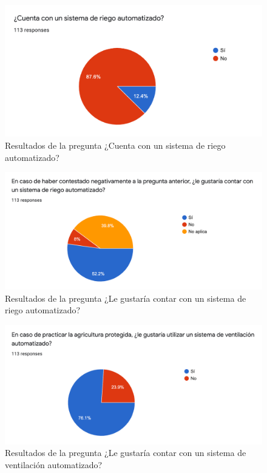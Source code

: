 \begin{figure}[!h]
	\centering
	\includegraphics[width=1\linewidth]{imagenes/encuesta/pregunta_3.png}
	\caption{Resultados de la pregunta ¿Cuenta con un sistema de riego automatizado?}
	\label{fig:pregunta_3}
\end{figure}

\begin{figure}[!h]
	\centering
	\includegraphics[width=1\linewidth]{imagenes/encuesta/pregunta_4.png}
	\caption{Resultados de la pregunta ¿Le gustaría contar con un sistema de riego automatizado?}
	\label{fig:pregunta_4}
\end{figure}

\begin{figure}[!h]
	\centering
	\includegraphics[width=1\linewidth]{imagenes/encuesta/pregunta_5.png}
	\caption{Resultados de la pregunta ¿Le gustaría contar con un sistema de ventilación automatizado?}
	\label{fig:pregunta_5}
\end{figure}

